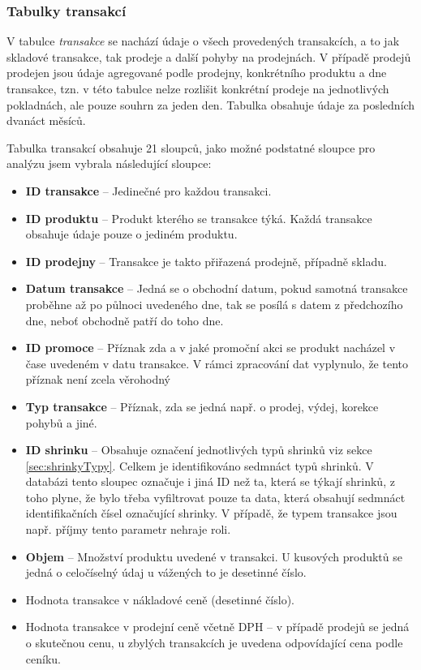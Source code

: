 \subsubsection{Tabulky transakcí}
V tabulce \emph{transakce} se nachází údaje o všech provedených transakcích, a to jak skladové transakce, tak prodeje a další pohyby na prodejnách. V případě prodejů prodejen jsou údaje agregované podle prodejny, konkrétního produktu a dne transakce, tzn. v této tabulce nelze rozlišit konkrétní prodeje na jednotlivých pokladnách, ale pouze souhrn za jeden den. Tabulka obsahuje údaje za posledních dvanáct měsíců.

Tabulka transakcí obsahuje 21 sloupců, jako možné podstatné sloupce pro analýzu jsem vybrala následující sloupce:

\begin{itemize}
    \itemsep0em
    \item \textbf{ID transakce} -- Jedinečné pro každou transakci.
    \item \textbf{ID produktu} -- Produkt kterého se transakce týká. Každá transakce obsahuje údaje pouze o jediném produktu. 
    \item \textbf{ID prodejny} -- Transakce je takto přiřazená prodejně, případně skladu. %
    \item \textbf{Datum transakce} -- Jedná se o obchodní datum, pokud samotná transakce proběhne až po půlnoci uvedeného dne, tak se posílá s datem z předchozího dne, neboť obchodně patří do toho dne.
    \item \textbf{ID promoce} -- Příznak zda a v jaké promoční akci se produkt nacházel v čase uvedeném v datu transakce. V rámci zpracování dat vyplynulo, že tento příznak není zcela věrohodný 
    \item \textbf{Typ transakce} -- Příznak, zda se jedná např. o prodej, výdej, korekce pohybů a jiné. 
    \item \textbf{ID shrinku} -- Obsahuje označení jednotlivých typů shrinků viz sekce \ref*{sec:shrinkyTypy}. Celkem je identifikováno sedmnáct typů shrinků. V databázi tento sloupec označuje i jiná ID než ta, která se týkají shrinků, z toho plyne, že bylo třeba vyfiltrovat pouze ta data, která obsahují sedmnáct identifikačních čísel označující shrinky. V případě, že typem transakce jsou např. příjmy tento parametr nehraje roli. %
    \item \textbf{Objem} -- Množství produktu uvedené v transakci. U kusových produktů se jedná o celočíselný údaj u vážených to je desetinné číslo.
    \item Hodnota transakce v nákladové ceně (desetinné číslo).
    \item Hodnota transakce v prodejní ceně včetně DPH -- v případě prodejů se jedná o skutečnou cenu, u zbylých transakcích je uvedena odpovídající cena podle ceníku.
\end{itemize}
